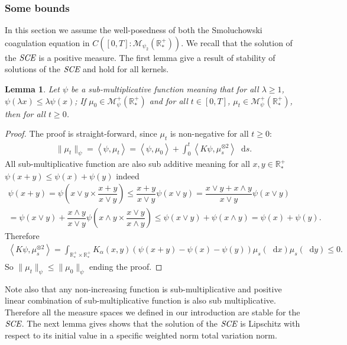 \documentclass[11pt,a4paper]{article}
\newcommand{\RRP}{\mathbb{R}^+_*}
\newcommand{\MC}{\mathcal{M}}
\newcommand{\SCE}{\emph{SCE}}
\newcommand{\brac}[1]{\left\langle#1\right\rangle}
\newcommand{\dd}{\mathop{}\!\mathrm{d}}
\newtheorem{lemma}[theorem]{Lemma}
\begin{document}
\subsubsection{Some bounds}
In this section we assume the well-posedness of both the Smoluchowski coagulation equation in $C([0,T]: \MC_{\psi_2}(\RRP))$. We recall that the solution of the \(\SCE\) is a positive measure. The first lemma give a result of stability of solutions of the \(\SCE\) and hold for all kernels.
\begin{lemma}\label{lem:sub-add-bounf-smol}
    Let $\psi$ be a sub-multiplicative function meaning that for all $\lambda \geq 1$, $\psi(\lambda x) \leq \lambda \psi(x)$; If $\mu_0 \in \MC^+_{\psi}(\RRP)$ and for all $t\in[0,T]$, $\mu_t \in \MC^+_{\psi}(\RRP)$, then for all $t\geq 0$.
\end{lemma}
\begin{proof}
    The proof is straight-forward, since $\mu_t$ is non-negative for all $t\geq 0$:
    \begin{align*}
        \|\mu_t\|_{\psi} = \brac{\psi,\mu_t} = \brac{\psi,\mu_0} + \int_0^t \brac{K\psi,\mu_s^{\otimes 2}}\dd s.
    \end{align*}
    All sub-multiplicative function are also sub additive meaning for all $x,y \in \RRP$ \(\psi(x+y) \leq \psi(x) + \psi(y)\) indeed
    \begin{multline*}
        \psi(x+y) = \psi\left(x\vee y \times \dfrac{x+y}{x\vee y} \right) \leq \dfrac{x+y}{x\vee y}\psi\left(x\vee y \right) = \dfrac{x\vee y +x\wedge y}{x\vee y}\psi\left(x\vee y \right) \\
         = \psi\left(x\vee y \right) + \dfrac{x\wedge y}{x\vee y} \psi\left(x\wedge  y \times \dfrac{x\vee  y}{x\wedge  y} \right) \leq \psi\left(x\vee y \right) +  \psi\left(x\wedge  y \right) = \psi\left(x \right) +  \psi\left(y \right).
    \end{multline*}
    Therefore
    \begin{align*}
        \brac{K\psi,\mu_s^{\otimes 2}} = \int_{\RRP\times \RRP} K_{\alpha}(x,y) \left(\psi(x+y) - \psi(x) - \psi(y)\right) \mu_s(\dd x) \mu_s (\dd y) \leq 0.
    \end{align*}
    So $ \|\mu_t\|_{\psi} \leq  \|\mu_0\|_{\psi}$ ending the proof.
\end{proof}
Note also that any non-increasing function is sub-multiplicative and positive linear combination of sub-multiplicative function is also sub multiplicative. Therefore all the measure spaces we defined in our introduction are stable for the $\SCE$. The next lemma gives shows that the solution of the $\SCE$ is Lipschitz with respect to its initial value in a specific weighted norm total variation norm.
\end{document}
